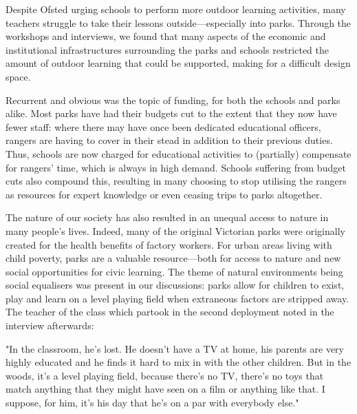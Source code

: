Despite Ofsted urging schools to perform more outdoor learning activities, many teachers struggle to take their lessons outside---especially into parks. Through the workshops and interviews, we found that many aspects of the economic and institutional infrastructures surrounding the parks and schools restricted the amount of outdoor learning that could be supported, making for a difficult design space.

Recurrent and obvious was the topic of funding, for both the schools and parks alike. Most parks have had their budgets cut to the extent that they now have fewer staff: where there may have once been dedicated educational officers, rangers are having to cover in their stead in addition to their previous duties. Thus, schools are now charged for educational activities to (partially) compensate for rangers’ time, which is always in high demand. Schools suffering from budget cuts also compound this, resulting in many choosing to stop utilising the rangers as resources for expert knowledge or even ceasing trips to parks altogether.

The nature of our society has also resulted in an unequal access to nature in many people’s lives. Indeed, many of the original Victorian parks were originally created for the health benefits of factory workers. For urban areas living with child poverty, parks are a valuable resource—both for access to nature and new social opportunities for civic learning. The theme of natural environments being social equalisers was present in our discussions: parks allow for children to exist, play and learn on a level playing field when extraneous factors are stripped away. The teacher of the class which partook in the second deployment noted in the interview afterwards:

\begin{displayquote}
"In the classroom, he's lost. He doesn't have a TV at home, his parents are very highly educated and he finds it hard to mix in with the other children. But in the woods, it's a level playing field, because there's no TV, there's no toys that match anything that they might have seen on a film or anything like that. I suppose, for him, it’s his day that he’s on a par with everybody else."
\end{displayquote}


